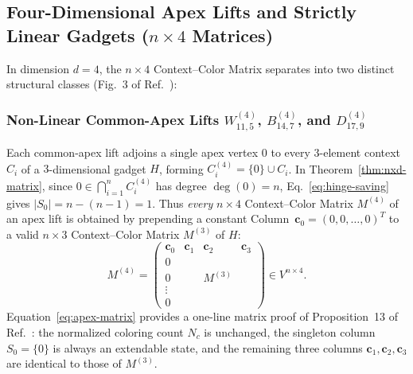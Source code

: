 \documentclass[aps,pra,reprint,superscriptaddress,longbibliography,nofootinbib,floatfix,10pt]{revtex4-2}
\theoremstyle{definition}\newtheorem{definition}[theorem]{Definition}
\theoremstyle{remark}\newtheorem{remark}[theorem]{Remark}
\begin{document}
\subsection{Four-Dimensional Apex Lifts and Strictly Linear Gadgets (\texorpdfstring{$n\times 4$}{n x 4} Matrices)}\label{sec:4d-gadgets}

In dimension $d=4$, the $n\times 4$ Context--Color Matrix separates into two distinct structural classes (Fig.~3 of Ref.~\cite{svozil-2025-color}):

\subsubsection{Non-Linear Common-Apex Lifts \texorpdfstring{$W_{11,5}^{(4)}$, $B_{14,7}^{(4)}$, and $D_{17,9}^{(4)}$}{W11,5(4), B14,7(4), and D17,9(4)}}
Each common-apex lift adjoins a single apex vertex $0$ to every $3$-element context $C_i$ of a $3$-dimensional gadget $H$, forming $C_i^{(4)}=\{0\}\cup C_i$. In Theorem~\ref{thm:nxd-matrix}, since $0\in\bigcap_{i=1}^n C_i^{(4)}$ has degree $\deg(0)=n$, Eq.~\eqref{eq:hinge-saving} gives $|S_0|=n-(n-1)=1$. Thus \emph{every} $n\times 4$ Context--Color Matrix $M^{(4)}$ of an apex lift is obtained by prepending a constant Column~$\mathbf{c}_0=(0,0,\ldots,0)^T$ to a valid $n\times 3$ Context--Color Matrix $M^{(3)}$ of $H$:
\begin{equation}\label{eq:apex-matrix}
M^{(4)}=\left(\begin{array}{c|ccc}
\mathbf{c}_0 & \mathbf{c}_1 & \mathbf{c}_2 & \mathbf{c}_3\\\hline
0 & & & \\
0 & & M^{(3)} & \\
\vdots & & & \\
0 & & &
\end{array}\right)\in V^{n\times 4}.
\end{equation}
Equation~\eqref{eq:apex-matrix} provides a one-line matrix proof of Proposition~13 of Ref.~\cite{svozil-2025-color}: the normalized coloring count $N_c$ is unchanged, the singleton column $S_0=\{0\}$ is always an extendable state, and the remaining three columns $\mathbf{c}_1,\mathbf{c}_2,\mathbf{c}_3$ are identical to those of $M^{(3)}$.
\end{document}
